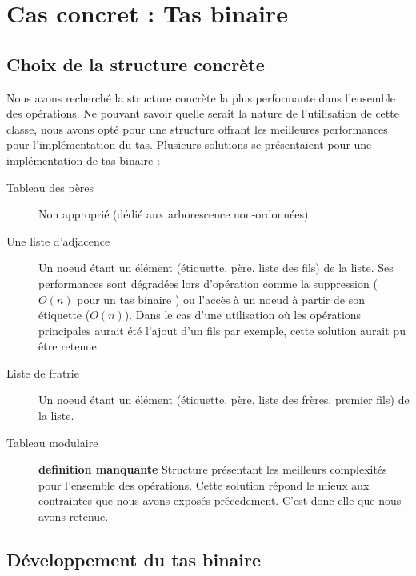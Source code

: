 \chapter[Tas]{Cas concret : Tas binaire}
\section[Structure concrète]{Choix de la structure concrète%
}



Nous avons recherché la structure concrète la plus performante dans l'ensemble des opérations. Ne pouvant savoir quelle serait la nature de l'utilisation de cette classe, nous avons opté pour une structure offrant les meilleures performances pour l'implémentation du tas.
Plusieurs solutions se présentaient pour une implémentation de tas binaire :
\begin{description}
\item
[Tableau des pères] Non approprié (dédié aux arborescence non-ordonnées).
\item[Une liste d'adjacence] Un noeud étant un élément  (étiquette, père, liste des fils) de la liste. Ses performances sont dégradées lors d'opération comme la suppression ($O(n)$ pour un tas binaire ) ou l'accès à un noeud à partir de son étiquette ($O(n)$). Dans le cas d'une utilisation où les opérations principales aurait été l'ajout d'un fils par exemple, cette solution aurait pu être retenue.
\item[Liste de fratrie]  Un noeud étant un élément (étiquette, père, liste des frères, premier fils)  de la liste.
\item[Tableau modulaire]
\textbf{definition manquante} Structure présentant les meilleurs complexités pour l'ensemble des opérations. Cette solution répond le mieux aux contraintes que nous avons exposés précedement. C'est donc elle que nous avons retenue. 
\end{description} 


\section[Développement]{Développement du tas binaire%
}

